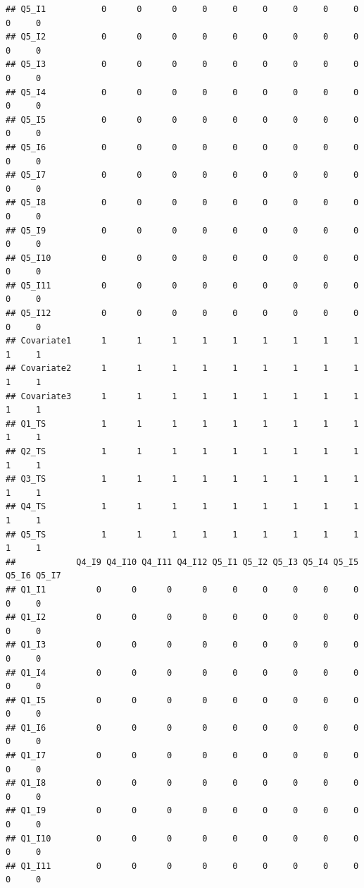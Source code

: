 \documentclass[
]{book}
\begin{document}
\begin{verbatim}
## Q5_I1           0      0      0     0     0     0     0     0     0     0     0
## Q5_I2           0      0      0     0     0     0     0     0     0     0     0
## Q5_I3           0      0      0     0     0     0     0     0     0     0     0
## Q5_I4           0      0      0     0     0     0     0     0     0     0     0
## Q5_I5           0      0      0     0     0     0     0     0     0     0     0
## Q5_I6           0      0      0     0     0     0     0     0     0     0     0
## Q5_I7           0      0      0     0     0     0     0     0     0     0     0
## Q5_I8           0      0      0     0     0     0     0     0     0     0     0
## Q5_I9           0      0      0     0     0     0     0     0     0     0     0
## Q5_I10          0      0      0     0     0     0     0     0     0     0     0
## Q5_I11          0      0      0     0     0     0     0     0     0     0     0
## Q5_I12          0      0      0     0     0     0     0     0     0     0     0
## Covariate1      1      1      1     1     1     1     1     1     1     1     1
## Covariate2      1      1      1     1     1     1     1     1     1     1     1
## Covariate3      1      1      1     1     1     1     1     1     1     1     1
## Q1_TS           1      1      1     1     1     1     1     1     1     1     1
## Q2_TS           1      1      1     1     1     1     1     1     1     1     1
## Q3_TS           1      1      1     1     1     1     1     1     1     1     1
## Q4_TS           1      1      1     1     1     1     1     1     1     1     1
## Q5_TS           1      1      1     1     1     1     1     1     1     1     1
##            Q4_I9 Q4_I10 Q4_I11 Q4_I12 Q5_I1 Q5_I2 Q5_I3 Q5_I4 Q5_I5 Q5_I6 Q5_I7
## Q1_I1          0      0      0      0     0     0     0     0     0     0     0
## Q1_I2          0      0      0      0     0     0     0     0     0     0     0
## Q1_I3          0      0      0      0     0     0     0     0     0     0     0
## Q1_I4          0      0      0      0     0     0     0     0     0     0     0
## Q1_I5          0      0      0      0     0     0     0     0     0     0     0
## Q1_I6          0      0      0      0     0     0     0     0     0     0     0
## Q1_I7          0      0      0      0     0     0     0     0     0     0     0
## Q1_I8          0      0      0      0     0     0     0     0     0     0     0
## Q1_I9          0      0      0      0     0     0     0     0     0     0     0
## Q1_I10         0      0      0      0     0     0     0     0     0     0     0
## Q1_I11         0      0      0      0     0     0     0     0     0     0     0

\end{verbatim}
\end{document}
